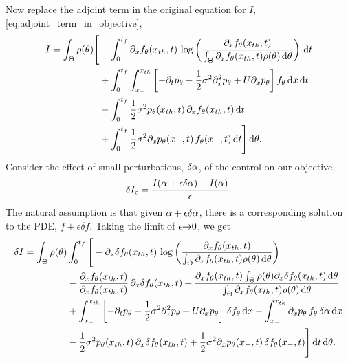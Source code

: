 Now replace the adjoint term in the original equation for $I$,
\cref{eq:adjoint_term_in_objective},
\begin{align*}
I=  
\int_\Theta  \rho({ \theta}) \Bigg[ 
&-\int_0^{{ t_f }} 
	  {\partial}_xf_{ \theta}({ x_{th} }, t)  \, 
		\log \left( \frac{{\partial}_xf_{ \theta}({ x_{th} }, t)}
						{\int_\Theta {\partial}_xf_{ \theta}({ x_{th} }, t)\rho({ \theta})\, \mathrm{d} { \theta} } \right)
\, \mathrm{d} t 
\\ &+
\int_0^{{ t_f }}\int_{x_-}^{{ x_{th} }} 
	\left[-{\partial}_tp_{ \theta} -  \frac{1 }{2}\sigma^2{\partial}^2_xp_{ \theta} + U
          {\partial}_xp_{ \theta} \right]  f_{ \theta}
\, \mathrm{d} x\, \mathrm{d} t
\\ 
&- \int_{0}^{{ t_f }} \frac{1 }{2}\sigma^2 p_{ \theta}({ x_{th} },t) \, {\partial}_xf_{ \theta}({ x_{th} },t) \, \mathrm{d} t
\\
& + \int_{0}^{{ t_f }} \frac{1 }{2}\sigma^2{\partial}_xp_{ \theta}(x_-,t) \, f_{ \theta}(x_-,t) \, \mathrm{d} t
\Bigg]				\, \mathrm{d} { \theta}	.   
\end{align*}
Consider the effect of small
perturbations, $\delta \alpha$, of the control on our objective, 
$$
\delta I_\epsilon =\frac{I(\alpha + \epsilon \delta \alpha) - I(\alpha)}{{\epsilon}}.
$$
The natural assumption is that given $\alpha + \epsilon \delta \alpha$, there is a
corresponding solution to the PDE, $f+ \epsilon \delta f$. 
Taking the limit of $\epsilon{\rightarrow}0$, we get
\begin{equation}
\begin{aligned}
\delta I =  
\int_\Theta  \rho({ \theta}) &\int_0^{{ t_f }} \Bigg[ 
-   {\partial}_x \delta f_{ \theta}({ x_{th} }, t)  \, 
		\log \left( \frac{{\partial}_xf_{ \theta}({ x_{th} }, t)}
						{\int_\Theta {\partial}_xf_{ \theta}({ x_{th} }, t)\rho({ \theta})\, \mathrm{d} { \theta} } \right)
\\ 
	&
-  \frac{ {\partial}_x f_{ \theta}({ x_{th} }, t)}{ {\partial}_x f_{ \theta}({ x_{th} }, t)}  \, {\partial}_x
		\delta f_{ \theta}({ x_{th} }, t)
+    \frac{ {\partial}_x f_{ \theta}({ x_{th} }, t) \int_\Theta \rho({ \theta}) {\partial}_x \delta f_{ \theta}({ x_{th} }, t) 	\, \mathrm{d} { \theta}	}{	{\int_\Theta {\partial}_xf_{ \theta}({ x_{th} },
	t)\rho({ \theta})\, \mathrm{d} { \theta} }} 		 			 
\\
 &+ \int_{x_-}^{{ x_{th} }} 
	\left[-{\partial}_tp_{ \theta} -  \frac{1 }{2}\sigma^2{\partial}^2_xp_{ \theta}  + U {\partial}_xp_{ \theta} \right]\,  \delta f_{ \theta}
\, \mathrm{d} x
- \int_{x_-}^{{ x_{th} }}
{\partial}_xp_{ \theta} \, f_{ \theta}\, \delta \alpha \, \mathrm{d} x
\\
 &-   \frac{1 }{2}\sigma^2 p_{ \theta}({ x_{th} },t) \, {\partial}_x\delta f_{ \theta}({ x_{th} },t) 
+  \frac{1 }{2}\sigma^2{\partial}_xp_{ \theta}(x_-,t) \, \delta f_{ \theta}(x_-,t)
  \Bigg]			 \, \mathrm{d} t	\, \mathrm{d} { \theta}	.   
\end{aligned} 
\label{eq:differential_I_before_refactoring}
\end{equation}
